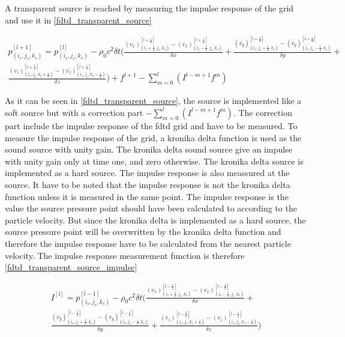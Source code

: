A transparent source is reached by measuring the impulse response of the grid and use it in \autoref{fdtd_transparent_source}

\begin{multline}\label{fdtd_transparent_source}
p_{(i_{s},j_{s},k_{s})}^{[l+1]}=p_{(i_{s},j_{s},k_{s})}^{[l]} - \rho_0 c^2 \delta t  \Biggl( \frac{(v_x)_{(i_{s}+\frac{1}{2},j_{s},k_{s})}^{[l+\frac{1}{2}]} - (v_x)_{(i_{s}-\frac{1}{2},j_{s},k_{s})}^{[l+\frac{1}{2}]}}{\delta x} +
 \frac{(v_y)_{(i_{s},j_{s}+\frac{1}{2},k_{s})}^{[l+\frac{1}{2}]}-(v_y)_{(i_{s},j_{s}-\frac{1}{2},k_{s})}^{[l+\frac{1}{2}]}}{\delta y} + \\ 
 \frac{(v_z)_{(i_{s},j_{s},k_{s}+\frac{1}{2})}^{[l+\frac{1}{2}]}-(v_z)_{(i_{s},j_{s},k_{s}-\frac{1}{2})}^{[l+\frac{1}{2}]}}{\delta z} \Biggr)
+f^{l+1}-\sum_{m=0}^{l} \left( I^{l-m+1}f^m \right)
\end{multline}

        \startexplain
    \stopexplain

As it can be seen in \autoref{fdtd_transparent_source}, the source is implemented like a soft source but with a correction part $-\sum_{m=0}^{l} \left( I^{l-m+1}f^m \right)$. The correction part include the impulse response of the \gls{fdtd} grid and have to be measured. To measure the impulse response of the grid, a kronika delta function is used as the sound source with unity gain. The kronika delta sound source give an impulse with unity gain only at time one, and zero otherwise. The kronika delta source is implemented as a hard source. The impulse response is also meassured at the source. It have to be noted that the impulse response is not the kronika delta function unless it is measured in the same point. The impulse response is the value the source pressure point should have been calculated to according to the particle velocity. But since the kronika delta is implemented as a hard source, the source pressure point will be overwritten by the kronika delta function and therefore  the impulse response have to be calculated from the nearest particle velocity. The impulse response measurement function is therefore \autoref{fdtd_transparent_source_impulse}

\begin{multline}\label{fdtd_transparent_source_impulse}
I^{[l]}=p_{(i_{s},j_{s},k_{s})}^{[l-1]} - \rho_0 c^2 \delta t  \Biggl( \frac{(v_x)_{(i_{s}+\frac{1}{2},j_{s},k_{s})}^{[l-\frac{1}{2}]} - (v_x)_{(i_{s}-\frac{1}{2},j_{s},k_{s})}^{[l-\frac{1}{2}]}}{\delta x} +\\
 \frac{(v_y)_{(i_{s},j_{s}+\frac{1}{2},k_{s})}^{[l-\frac{1}{2}]}-(v_y)_{(i_{s},j_{s}-\frac{1}{2},k_{s})}^{[l-\frac{1}{2}]}}{\delta y} +  
 \frac{(v_z)_{(i_{s},j_{s},k_{s}+\frac{1}{2})}^{[l-\frac{1}{2}]}-(v_z)_{(i_{s},j_{s},k_{s}-\frac{1}{2})}^{[l-\frac{1}{2}]}}{\delta z} \Biggr)
\end{multline}


